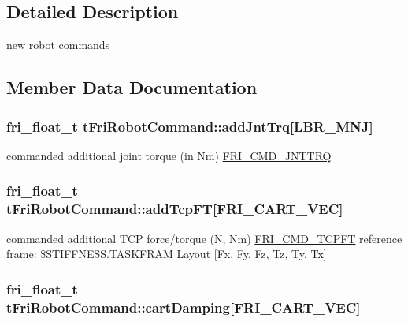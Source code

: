\subsection{\-Detailed \-Description}
new robot commands 

\subsection{\-Member \-Data \-Documentation}
\hypertarget{structtFriRobotCommand_a07743e3a1bcba4c45b78b9f5a1015077}{
\subsubsection[{add\-Jnt\-Trq}]{\setlength{\rightskip}{0pt plus 5cm}fri\-\_\-float\-\_\-t {\bf t\-Fri\-Robot\-Command\-::add\-Jnt\-Trq}\mbox{[}{\bf \-L\-B\-R\-\_\-\-M\-N\-J}\mbox{]}}}\label{structtFriRobotCommand_a07743e3a1bcba4c45b78b9f5a1015077}
commanded additional joint torque (in \-Nm) \hyperlink{friComm_8h_a9332fbd2b101ab70cee4965bc7b4840e}{\-F\-R\-I\-\_\-\-C\-M\-D\-\_\-\-J\-N\-T\-T\-R\-Q} \hypertarget{structtFriRobotCommand_abee53add49473f5a3b4f276f115afef1}{
\subsubsection[{add\-Tcp\-F\-T}]{\setlength{\rightskip}{0pt plus 5cm}fri\-\_\-float\-\_\-t {\bf t\-Fri\-Robot\-Command\-::add\-Tcp\-F\-T}\mbox{[}{\bf \-F\-R\-I\-\_\-\-C\-A\-R\-T\-\_\-\-V\-E\-C}\mbox{]}}}\label{structtFriRobotCommand_abee53add49473f5a3b4f276f115afef1}
commanded additional \-T\-C\-P force/torque (\-N, \-Nm) \hyperlink{friComm_8h_a6eee7fb82b7fc49f537342be90296860}{\-F\-R\-I\-\_\-\-C\-M\-D\-\_\-\-T\-C\-P\-F\-T} reference frame\-: \$\-S\-T\-I\-F\-F\-N\-E\-S\-S.\-T\-A\-S\-K\-F\-R\-A\-M \-Layout \mbox{[}\-Fx, \-Fy, \-Fz, \-Tz, \-Ty, \-Tx\mbox{]} \hypertarget{structtFriRobotCommand_adcfcf4a2d60cc0b93170cdf8900798d0}{
\subsubsection[{cart\-Damping}]{\setlength{\rightskip}{0pt plus 5cm}fri\-\_\-float\-\_\-t {\bf t\-Fri\-Robot\-Command\-::cart\-Damping}\mbox{[}{\bf \-F\-R\-I\-\_\-\-C\-A\-R\-T\-\_\-\-V\-E\-C}\mbox{]}}}\label{structtFriRobotCommand_adcfcf4a2d60cc0b93170cdf8900798d0}
